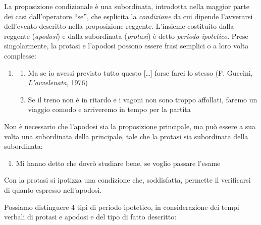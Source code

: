 \documentclass[
  a4paper,
  twoside,
  11pt,
  chapterprefix=false,
  bibliography=totocnumbered,
  listof=flat]{scrbook}
\providecommand{\tightlist}{%
  \setlength{\itemsep}{0pt}\setlength{\parskip}{0pt}}
\begin{document}
La proposizione condizionale è una subordinata, introdotta nella maggior parte dei casi dall'operatore \enquote{se}, che esplicita la \emph{condizione} da cui dipende l'avverarsi dell'evento descritto nella proposizione reggente. L'insieme costituito dalla reggente (\emph{apodosi}) e dalla subordinata (\emph{protasi}) è detto \emph{periodo ipotetico}. Prese singolarmente, la protasi e l'apodosi possono essere frasi semplici o a loro volta complesse:

\begin{enumerate}
\def\labelenumi{(\arabic{enumi})}
\setcounter{enumi}{82}
\item
  \begin{enumerate}
  \def\labelenumii{\alph{enumii}.}
  \tightlist
  \item
    Ma se io avessi previsto tutto questo {[}\ldots{]} forse farei lo stesso (F. Guccini, \emph{L'avvelenata}, 1976)
  \item
    Se il treno non è in ritardo e i vagoni non sono troppo affollati, faremo un viaggio comodo e arriveremo in tempo per la partita
  \end{enumerate}
\end{enumerate}

Non è necessario che l'apodosi sia la proposizione principale, ma può essere a sua volta una subordinata della principale, tale che la protasi sia subordinata della subordinata:

\begin{enumerate}
\def\labelenumi{(\arabic{enumi})}
\setcounter{enumi}{83}
\tightlist
\item
  Mi hanno detto che dovrò studiare bene, se voglio passare l'esame
\end{enumerate}

Con la protasi si ipotizza una condizione che, soddisfatta, permette il verificarsi di quanto espresso nell'apodosi.

Possiamo distinguere 4 tipi di periodo ipotetico, in considerazione dei tempi verbali di protasi e apodosi e del tipo di fatto descritto:
\end{document}
